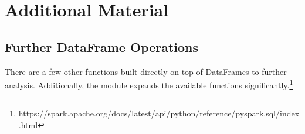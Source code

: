 
\newpage

\section*{Additional Material} %

\subsection*{Further DataFrame Operations}

There are a few other functions built directly on top of DataFrames to further analysis.
Additionally, the  module expands the available functions significantly.\footnote{https://spark.apache.org/docs/latest/api/python/reference/pyspark.sql/index.html}

